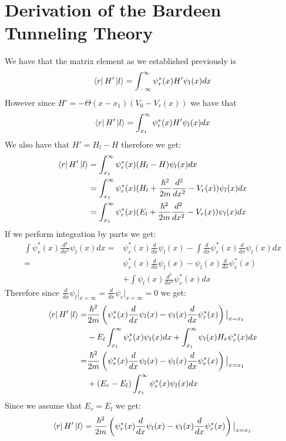 \documentclass[
  reprint,
  amsmath,amssymb,
  aps
]{revtex4-1}
\begin{document}
\section{Derivation of the Bardeen Tunneling Theory}
We have that the matrix element as we established previously is 
\begin{equation}
    \bra{r}H'\ket{l} = \int_{-\infty}^{\infty}\psi_r^*(x)H'\psi_l(x)dx
\end{equation}
However since $H' = -\Theta(x-x_1)(V_0-V_r(x))$ we have that 
\begin{equation}
    \bra{r}H'\ket{l} = \int_{x_1}^{\infty}\psi_r^*(x)H'\psi_l(x)dx
\end{equation}
We also have that $H' = H_l-H$ therefore we get:
\begin{align}
    \bra{r}H'\ket{l} &= \int_{x_1}^{\infty}\psi_r^*(x)(H_l-H)\psi_l(x)dx\\
    &= \int_{x_1}^{\infty}\psi_r^*(x)(H_l+\frac{\hbar^2}{2m}\frac{d^2}{dx^2}-V_r(x))\psi_l(x)dx\\
    &= \int_{x_1}^{\infty}\psi_r^*(x)(E_l+\frac{\hbar^2}{2m}\frac{d^2}{dx^2}-V_r(x))\psi_l(x)dx
\end{align}
If we perform integration by parts we get:
\begin{align*}
    \int\psi_r^*(x)\frac{d^2}{dx^2}\psi_l(x)dx =& \psi_r^*(x)\frac{d}{dx}\psi_l(x)- \int\frac{d}{dx}\psi_r^*(x)\frac{d}{dx}\psi_l(x)dx\\
    =& \psi_r^*(x)\frac{d}{dx}\psi_l(x) - \psi_l(x)\frac{d}{dx}\psi_r^*(x)\\
    & + \int\psi_l(x)\frac{d^2}{dx^2}\psi_r^*(x)dx
\end{align*}
Therefore since $\frac{d}{dx}\psi_l\big|_{x=\infty} = \frac{d}{dx}\psi_r\big|_{x=\infty} = 0$ we get:
\begin{align*}
    \bra{r}H'\ket{l} =& \frac{\hbar^2}{2m}\left(\psi_r^*(x)\frac{d}{dx}\psi_l(x) - \psi_l(x)\frac{d}{dx}\psi_r^*(x)\right)\big|_{x=x_1}\\
            &-E_l\int_{x_1}^{\infty}\psi_r^*(x)\psi_l(x)dx+
            \int_{x_1}^{\infty}\psi_l(x)H_r\psi_r^*(x)dx\\
            =& \frac{\hbar^2}{2m}\left(\psi_r^*(x)\frac{d}{dx}\psi_l(x) - \psi_l(x)\frac{d}{dx}\psi_r^*(x)\right)\big|_{x=x_1}\\
            &+(E_r-E_l)\int_{x_1}^{\infty}\psi_r^*(x)\psi_l(x)dx
\end{align*}
Since we assume that $E_r=E_l$ we get:
\begin{equation}
    \bra{r}H'\ket{l} = \frac{\hbar^2}{2m}\left(\psi_r^*(x)\frac{d}{dx}\psi_l(x) - \psi_l(x)\frac{d}{dx}\psi_r^*(x)\right)\big|_{x=x_1}
\end{equation}
\end{document}
